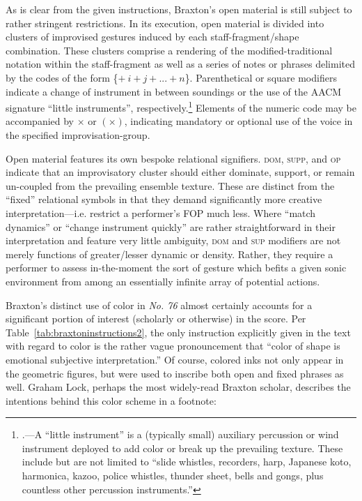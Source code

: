         As is clear from the given instructions, Braxton's open material is still subject to rather stringent restrictions. In its execution, open material is divided into clusters of improvised gestures induced by each staff-fragment/shape combination. These clusters comprise a rendering of the modified-traditional notation within the staff-fragment as well as a series of notes or phrases delimited by the codes of the form \{$+\:i + j +... + n$\}. Parenthetical or square modifiers indicate a change of instrument in between soundings or the use of the AACM signature ``little instruments'', respectively.\footnote{\autocite[170]{Jost_1994}.---A ``little instrument'' is a (typically small) auxiliary percussion or wind instrument deployed to add color or break up the prevailing texture. These include but are not limited to ``slide whistles, recorders, harp, Japanese koto, harmonica, kazoo, police whistles, thunder sheet, bells and gongs, plus countless other percussion instruments.''} Elements of the numeric code may be accompanied by $\times$ or $(\times)$, indicating mandatory or optional use of the voice in the specified improvisation-group.
    
        Open material features its own bespoke relational signifiers. \textsc{dom}, \textsc{supp}, and \textsc{op} indicate that an improvisatory cluster should either dominate, support, or remain un-coupled from the prevailing ensemble texture. These are distinct from the ``fixed'' relational symbols in that they demand significantly more creative interpretation---i.e. restrict a performer's FOP much less. Where ``match dynamics'' or ``change instrument quickly'' are rather straightforward in their interpretation and feature very little ambiguity, \textsc{dom} and \textsc{sup} modifiers are not merely functions of greater/lesser dynamic or density. Rather, they require a performer to assess in-the-moment the sort of gesture which befits a given sonic environment from among an essentially infinite array of potential actions.

        Braxton's distinct use of color in \textit{No. 76} almost certainly accounts for a significant portion of interest (scholarly or otherwise) in the score. Per Table~\ref{tab:braxtoninstructions2}, the only instruction explicitly given in the text with regard to color is the rather vague pronouncement that ``color of shape is emotional subjective interpretation.'' Of course, colored inks not only appear in the geometric figures, but were used to inscribe both open and fixed phrases as well. Graham Lock, perhaps the most widely-read Braxton scholar, describes the intentions behind this color scheme in a footnote:
        
